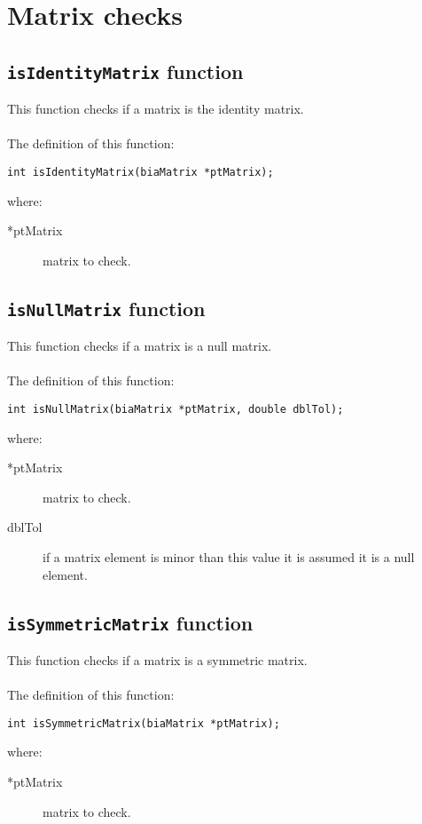\section{Matrix checks}

\subsection{\texttt{isIdentityMatrix} function}

This function checks if a matrix is the identity matrix.\\ \\
%
The definition of this function:
%
\begin{verbatim}
int isIdentityMatrix(biaMatrix *ptMatrix);
\end{verbatim}
%
where:
%
\begin{description}
\item[*ptMatrix] matrix to check.
\end{description}
%

\subsection{\texttt{isNullMatrix} function}

This function checks if a matrix is a null matrix.\\ \\
%
The definition of this function:
%
\begin{verbatim}
int isNullMatrix(biaMatrix *ptMatrix, double dblTol);
\end{verbatim}
%
where:
%
\begin{description}
\item[*ptMatrix] matrix to check.
\item[dblTol] if a matrix element is minor than this value it is assumed it is a null element.
\end{description}
%

\subsection{\texttt{isSymmetricMatrix} function}

This function checks if a matrix is a symmetric matrix.\\ \\
%
The definition of this function:
%
\begin{verbatim}
int isSymmetricMatrix(biaMatrix *ptMatrix);
\end{verbatim}
%
where:
%
\begin{description}
\item[*ptMatrix] matrix to check.
\end{description}
%
